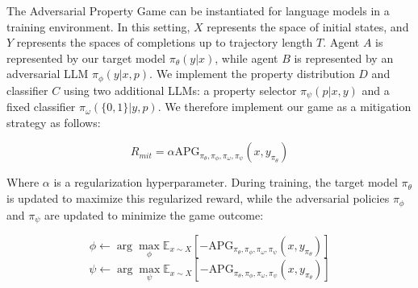 


The Adversarial Property Game can be instantiated for language models in a training environment. In this setting, $X$ represents the space of initial states, and $Y$ represents the spaces of completions up to trajectory length $T$. Agent $A$ is represented by our target model $\pi_\theta(y|x)$, while agent $B$ is represented by an adversarial LLM $\pi_\phi(y|x,p)$. We implement the property distribution $D$ and classifier $C$ using two additional LLMs: a property selector $\pi_\psi(p|x,y)$ and a fixed classifier $\pi_\omega(\{0,1\}|y,p)$. We therefore implement our game as a mitigation strategy as follows:

\begin{equation}
R_{mit} = \alpha \text{APG}_{\pi_\theta, \pi_\phi, \pi_\omega, \pi_\psi}(x, y_{\pi_\theta})
\end{equation}

Where $\alpha$ is a regularization hyperparameter. During training, the target model $\pi_\theta$ is updated to maximize this regularized reward, while the adversarial policies $\pi_\phi$ and $\pi_\psi$ are updated to minimize the game outcome:

\begin{equation}
\phi \gets \arg\max_{\phi} \mathbb{E}_{x \sim X} [-\text{APG}_{\pi_\theta, \pi_\phi, \pi_\omega, \pi_\psi}(x,  y_{\pi_\theta})]
\end{equation}
\begin{equation}
\psi \gets \arg\max_{\psi} \mathbb{E}_{x \sim X} [-\text{APG}_{\pi_\theta, \pi_\phi, \pi_\omega, \pi_\psi}(x,  y_{\pi_\theta})]
\end{equation}

